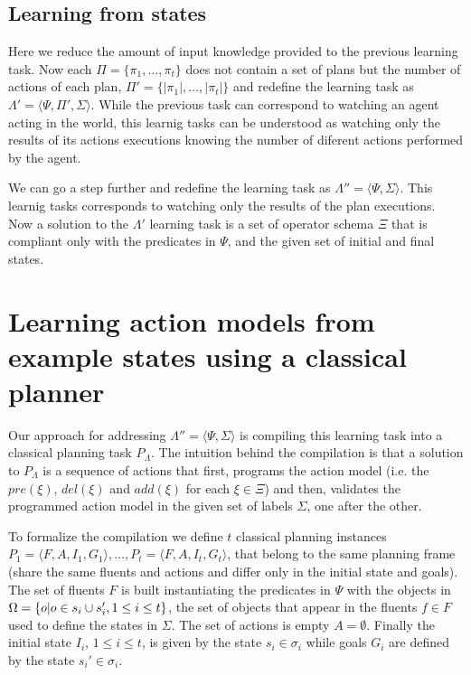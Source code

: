\documentclass[letterpaper]{article} %
\newcommand{\tup}[1]{{\langle #1 \rangle}}
\begin{document}
\subsection{Learning from states}
Here we reduce the amount of input knowledge provided to the previous learning task. Now each $\Pi=\{\pi_1,\ldots,\pi_t\}$ does not contain a set of plans but the number of actions of each plan, $\Pi'=\{|\pi_1|,\ldots,|\pi_t|\}$ and redefine the learning task as $\Lambda'=\tup{\Psi,\Pi',\Sigma}$. While the previous task can correspond to watching an agent acting in the world, this learnig tasks can be understood as watching only the results of its actions executions knowing the number of diferent actions performed by the agent.

We can go a step further and redefine the learning task as $\Lambda''=\tup{\Psi,\Sigma}$. This learnig tasks corresponds to watching only the results of the plan executions. Now a solution to the $\Lambda'$ learning task is a set of operator schema $\Xi$ that is compliant only with the predicates in $\Psi$, and the given set of initial and final states.


\section{Learning action models from example states using a classical planner}
Our approach for addressing $\Lambda''=\tup{\Psi,\Sigma}$ is compiling this learning task into a classical planning task $P_{\Lambda}$. The intuition behind the compilation is that a solution to $P_{\Lambda}$ is a sequence of actions that first, programs the action model (i.e. the $pre(\xi)$, $del(\xi)$ and $add(\xi)$ for each $\xi\in\Xi$) and then, validates the programmed action model in the given set of labels $\Sigma$, one after the other.

To formalize the compilation we define $t$ classical planning instances $P_1=\tup{F,A,I_1,G_1},\ldots,P_t=\tup{F,A,I_t,G_t}$, that belong to the same planning frame (share the same fluents and actions and differ only in the initial state and goals). The set of fluents $F$ is built instantiating the predicates in $\Psi$ with the objects in $\Omega=\{o|o\in s_i\cup s_i', {\small 1\leq i\leq t}\}$, the set of objects that appear in the fluents $f\in F$ used to define the states in $\Sigma$. The set of actions is empty $A=\emptyset$. Finally the initial state $I_i$, {\small $1\leq i\leq t$}, is given by the state $s_i\in \sigma_i$ while goals $G_i$ are defined by the state $s_i'\in \sigma_i$. 
\end{document}
